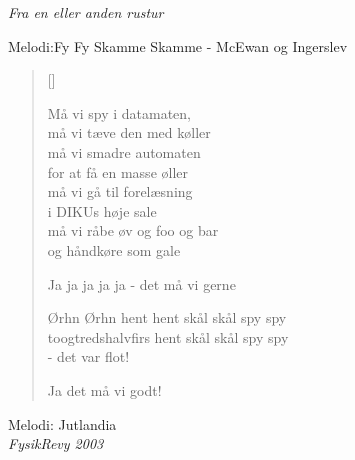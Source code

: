 {\small\itshape Fra en eller anden rustur}
\begin{multicols}{2}
{Melodi:Fy Fy Skamme Skamme - McEwan og Ingerslev}
\settowidth{\versewidth}{Jeg tog til hospitalet og fik hjælp af en blondine.}
\begin{verse}[\versewidth]

Må vi spy i datamaten,\\
må vi tæve den med køller\\
må vi smadre automaten\\
for at få en masse øller\\
må vi gå til forelæsning\\
i DIKUs høje sale\\
må vi råbe øv og foo og bar\\
og håndkøre som gale

Ja ja ja ja ja - det må vi gerne

Ørhn Ørhn hent hent skål skål spy spy\\
toogtredshalvfirs hent skål skål spy spy\\
- det var flot!

Ja det må vi godt!
\end{verse}
\end{multicols}

\newpage

{Melodi: Jutlandia}\\[.2em]
{\small\itshape FysikRevy 2003}

